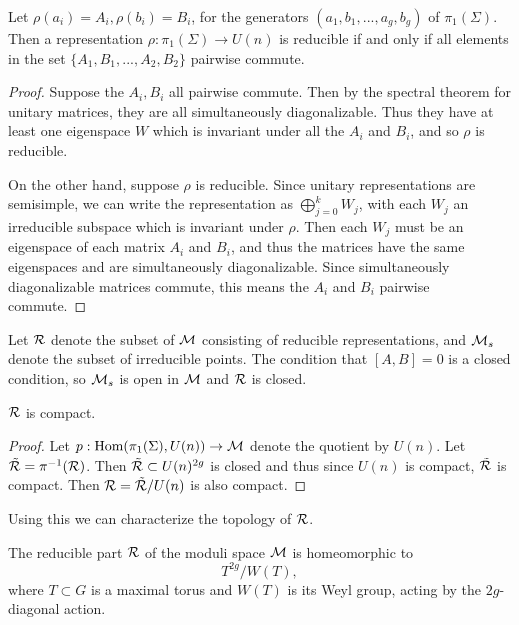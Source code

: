	\begin{lemma}
		\label{l:irrep-lemma}
		Let $\rho(a_i) = A_i, \rho(b_i) = B_i$, for the generators $(a_1,b_1,...,a_g,b_g)$ of $\pi_1(\Sigma)$. Then a representation $\rho:\pi_1(\Sigma) \to U(n)$ is reducible if and only if all elements in the set $\{A_1,B_1,...,A_2,B_2\}$ pairwise commute.
	\end{lemma}
	\begin{proof}
		Suppose the $A_i,B_i$ all pairwise commute. Then by the spectral theorem for unitary matrices, they are all simultaneously diagonalizable. Thus they have at least one eigenspace $W$ which is invariant under all the $A_i$ and $B_i$, and so $\rho$ is reducible.
		
		On the other hand, suppose $\rho$ is reducible. Since unitary representations are semisimple, we can write the representation as $\bigoplus_{j=0}^k W_j$, with each $W_j$ an irreducible subspace which is invariant under $\rho$. Then each $W_j$ must be an eigenspace of each matrix $A_i$ and $B_i$, and thus the matrices have the same eigenspaces and are simultaneously diagonalizable. Since simultaneously diagonalizable matrices commute, this means the $A_i$ and $B_i$ pairwise commute. 
	\end{proof}
	Let $\mathcal{R}$ denote the subset of $\mathcal{M}$ consisting of reducible representations, and $\mathcal{M}_s$ denote the subset of irreducible points. The condition that $[A,B] =0$ is a closed condition, so $\mathcal{M}_s$ is open in $\mathcal{M}$ and $\mathcal{R}$ is closed.
	\begin{lemma}
		$\mathcal{R}$ is compact.
	\end{lemma}
	\begin{proof}
		Let $p:\text{Hom}(\pi_1(\Sigma),U(n))\to \mathcal{M}$ denote the quotient by $U(n)$. Let $\tilde{\mathcal{R}} = \pi^{-1}(\mathcal{R})$. Then $\tilde{\mathcal{R}} \subset U(n)^{2g}$ is closed and thus since $U(n)$ is compact, $\tilde{\mathcal{R}}$ is compact. Then $\mathcal{R} = \tilde{\mathcal{R}}/U(n)$ is also compact.
	\end{proof}
	Using this we can characterize the topology of $\mathcal{R}$.
	\begin{theorem}
		\label{t:reducibletorus}
		The reducible part $\mathcal{R}$ of the moduli space $\mathcal{M}$ is homeomorphic to
		\begin{equation}
			T^{2g}/W(T),
		\end{equation}
		where $T\subset G$ is a maximal torus and $W(T)$ is its Weyl group, acting by the $2g$-diagonal action.
	\end{theorem}

